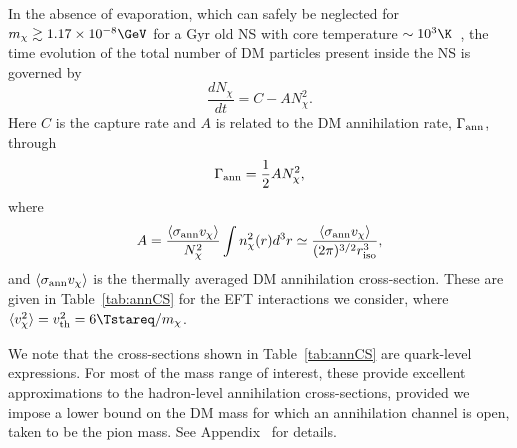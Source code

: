 In the absence of evaporation, which can safely be neglected for $m_\chi \gtrsim 1.17\times 10^{-8}\GeV$ for a Gyr old NS with core temperature $\sim 10^3\K$~\cite{Bell:2020lmm_mar_ImprovedTreatmentDark}, the time evolution of the total number of DM particles present inside the NS is governed by
\begin{equation}
    \frac{dN_\chi}{dt} = C - A N_\chi^2 \label{eq:ndm}.
\end{equation}
Here $C$ is the capture rate and  $A$ is related to the DM annihilation rate, $\Gamma_{\rm ann}$, through
\begin{equation}
    \Gamma_{\rm ann} =  \frac{1}{2}A N_\chi^2,
\end{equation}
where
\begin{equation}
    A = \frac{\langle \sigma_\text{ann}v_\chi \rangle}{N_\chi^2} \int n_\chi^2(r) d^3 r \simeq \frac{\langle \sigma_\text{ann} v_\chi\rangle}{(2\pi)^{3/2} r_{\rm iso}^3}, \label{eq:annrate}
\end{equation}
and $\langle \sigma_{\rm ann} v_\chi \rangle$ is the
thermally averaged DM annihilation cross-section. These are given in Table~\ref{tab:annCS} for the EFT interactions we consider, where $\langle v^2_\chi \rangle = v_{\rm th}^2 =  6 \Tstareq/ m_\chi$.


We note that the cross-sections shown in Table~\ref{tab:annCS} are quark-level expressions. For most of the mass range of interest, these provide excellent approximations to the hadron-level annihilation cross-sections, provided we impose a lower bound on the DM mass for which an annihilation channel is open, taken to be the pion mass. See Appendix~ for details.




